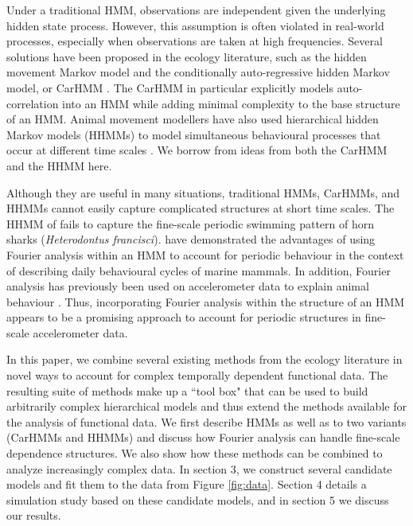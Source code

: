Under a traditional HMM, observations are independent given the underlying hidden state process. However, this assumption is often violated in real-world processes, especially when observations are taken at high frequencies. Several solutions have been proposed in the ecology literature, such as the hidden movement Markov model \citep{Whoriskey:2016} and the conditionally auto-regressive hidden Markov model, or CarHMM \citep{Lawler:2019}. The CarHMM in particular explicitly models auto-correlation into an HMM while adding minimal complexity to the base structure of an HMM. Animal movement modellers have also used hierarchical hidden Markov models (HHMMs) to model simultaneous behavioural processes that occur at different time scales \citep{Barajas:2017,Adam:2019}. We borrow from ideas from both the CarHMM and the HHMM here.

Although they are useful in many situations, traditional HMMs, CarHMMs, and HHMMs cannot easily capture complicated structures at short time scales. The HHMM of \citet{Adam:2019} fails to capture the fine-scale periodic swimming pattern of horn sharks (\textit{Heterodontus francisci}). \citet{Heerah:2017} have demonstrated the advantages of using Fourier analysis within an HMM to account for periodic behaviour in the context of describing daily behavioural cycles of marine mammals. In addition, Fourier analysis has previously been used on accelerometer data to explain animal behaviour \citep{Fehlmann:2017,Shorter:2017}. Thus, incorporating Fourier analysis within the structure of an HMM appears to be a promising approach to account for periodic structures in fine-scale accelerometer data.

In this paper, we combine several existing methods from the ecology literature in novel ways to account for complex temporally dependent functional data. The resulting suite of methods make up a ``tool box" that can be used to build arbitrarily complex hierarchical models and thus extend the methods available for the analysis of functional data. We first describe HMMs as well as to two variants (CarHMMs and HHMMs) and discuss how Fourier analysis can handle fine-scale dependence structures. We also show how these methods can be combined to analyze increasingly complex data. In section 3, we construct several candidate models and fit them to the data from Figure \ref{fig:data}. Section 4 details a simulation study based on these candidate models, and in section 5 we discuss our results.